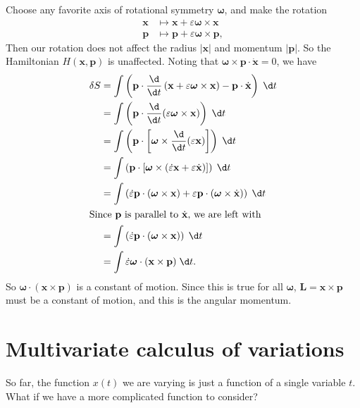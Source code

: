 \documentclass[a4paper]{article}
\begin{document}
\begin{eg}
\begin{enumerate}
      Choose any favorite axis of rotational symmetry $\boldsymbol\omega$, and make the rotation
      \begin{align*}
        \mathbf{x}&\mapsto \mathbf{x} + \varepsilon\boldsymbol\omega\times \mathbf{x}\\
        \mathbf{p}&\mapsto \mathbf{p} + \varepsilon\boldsymbol\omega\times \mathbf{p},
      \end{align*}
      Then our rotation does not affect the radius $|\mathbf{x}|$ and momentum $|\mathbf{p}|$. So the Hamiltonian $H(\mathbf{x}, \mathbf{p})$ is unaffected. Noting that $\boldsymbol\omega \times \mathbf{p} \cdot \dot{\mathbf{x}} = 0$, we have
      \begin{align*}
        \delta S &= \int \left(\mathbf{p}\cdot \frac{\d}{\d t}\left(\mathbf{x} + \varepsilon\boldsymbol\omega \times \mathbf{x}\right) - \mathbf{p}\cdot \dot{\mathbf{x}}\right)\;\d t\\
        &= \int \left(\mathbf{p}\cdot \frac{\d}{\d t}(\varepsilon\boldsymbol\omega\times \mathbf{x})\right)\;\d t\\
        &= \int \left(\mathbf{p}\cdot \left[\boldsymbol\omega\times \frac{\d}{\d t}(\varepsilon\mathbf{x})\right]\right)\;\d t\\
        &= \int \left(\mathbf{p}\cdot \left[\boldsymbol\omega\times (\dot{\varepsilon} \mathbf{x} + \varepsilon \dot{\mathbf{x}})\right]\right)\;\d t\\
        &= \int \left(\dot{\varepsilon}\mathbf{p}\cdot (\boldsymbol\omega\times \mathbf{x}) + \varepsilon \mathbf{p}\cdot (\boldsymbol\omega \times \dot{\mathbf{x}})\right)\;\d t\\
        \intertext{Since $\mathbf{p}$ is parallel to $\dot{\mathbf{x}}$, we are left with}
        &= \int \left(\dot{\varepsilon}\mathbf{p}\cdot (\boldsymbol\omega\times \mathbf{x})\right)\;\d t\\
        &= \int \dot{\varepsilon}\boldsymbol\omega\cdot (\mathbf{x}\times \mathbf{p})\;\d t.
      \end{align*}
      So $\boldsymbol\omega\cdot (\mathbf{x}\times \mathbf{p})$ is a constant of motion. Since this is true for all $\boldsymbol\omega$, $\mathbf{L} = \mathbf{x}\times \mathbf{p}$ must be a constant of motion, and this is the angular momentum.
  \end{enumerate}
\end{eg}
\section{Multivariate calculus of variations}
So far, the function $x(t)$ we are varying is just a function of a single variable $t$. What if we have a more complicated function to consider?
\end{document}
